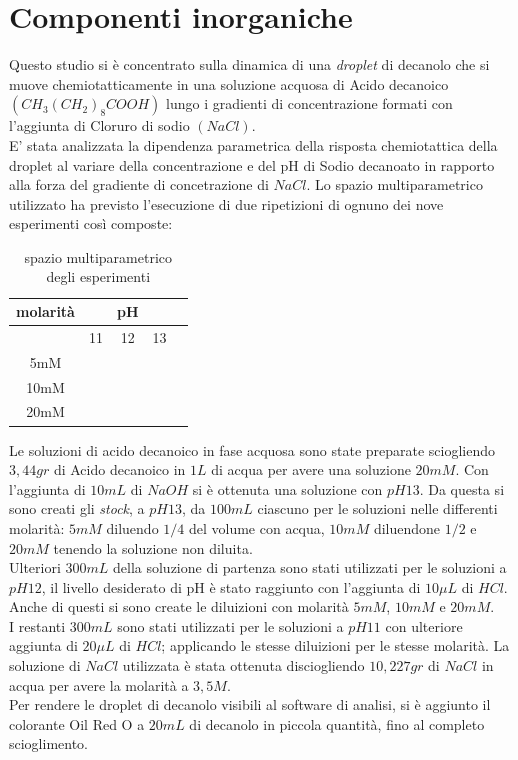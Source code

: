 \section{Componenti inorganiche}
\label{sec:123}
Questo studio si è concentrato sulla dinamica di una \emph{droplet} di decanolo  che si muove chemiotatticamente in una soluzione acquosa di Acido decanoico $(CH_{3}(CH_{2})_8COOH)$ lungo i gradienti di concentrazione formati con l'aggiunta di Cloruro di sodio $(NaCl)$.\cite{ikea}
\\E' stata analizzata la dipendenza parametrica della risposta chemiotattica della droplet al variare della concentrazione e del pH di Sodio decanoato in rapporto alla forza del gradiente di concetrazione di $NaCl$. 
Lo spazio multiparametrico utilizzato ha previsto l'esecuzione di due ripetizioni di ognuno dei nove esperimenti così composte: 
\begin{table}[htbp] 
  \begin{center} 
    \begin{tabular}{c|cccc} 
      \textbf{molarità} & & \textbf{pH}\\ 
      \midrule 
	& 11 & 12 & 13\\ 
\hline
	5mM\\
\hline
	10mM\\
\hline
	20mM\\ 
	\hline 
     \end{tabular} 
   \end{center} 
	\caption{spazio multiparametrico degli esperimenti}
\end{table}

Le soluzioni di acido decanoico in fase acquosa sono state preparate sciogliendo $3,44gr$ di Acido decanoico  in $1L$ di acqua per avere una soluzione $20mM$. Con l'aggiunta di $10mL$ di $NaOH$ si è ottenuta una soluzione con $pH 13$. 
Da questa si sono creati gli \emph{stock}, a $pH13$, da $100mL$ ciascuno per le soluzioni nelle differenti molarità: $5mM$ diluendo $1/4$ del volume con acqua, $10mM$ diluendone $1/2$ e $20mM$ tenendo la soluzione non diluita.
\\Ulteriori $300mL$ della soluzione di partenza sono stati utilizzati per le soluzioni a $pH 12$, il livello desiderato di pH è stato raggiunto con l'aggiunta di $10\mu L$ di $HCl$. Anche di questi si sono create le diluizioni con molarità $5mM$, $10mM$ e $20mM$. 
\\I restanti $300mL$ sono stati utilizzati per le soluzioni a $pH11$ con ulteriore aggiunta di $20\mu L$ di $HCl$; applicando le stesse diluizioni per le stesse molarità.
La soluzione di $NaCl$ utilizzata è stata ottenuta disciogliendo $10,227gr$ di $NaCl$ in acqua per avere la molarità a $3,5M$.
\\Per rendere le droplet di decanolo visibili al software di analisi, si è aggiunto il colorante Oil Red O a $20mL$ di decanolo in piccola quantità, fino al completo scioglimento.  






